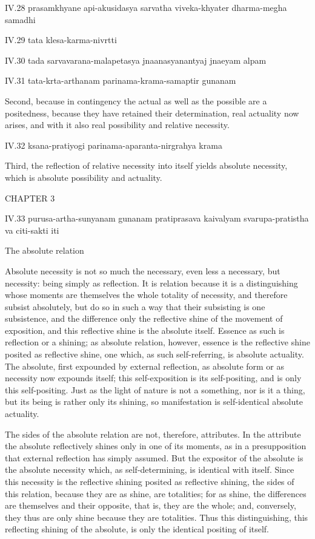 IV.28
prasamkhyane api-akusidasya sarvatha viveka-khyater dharma-megha samadhi

IV.29
tata klesa-karma-nivrtti

IV.30
tada sarvavarana-malapetasya jnaanasyanantyaj jnaeyam alpam

IV.31
tata-krta-arthanam parinama-krama-samaptir gunanam

Second, because in contingency the actual as well as the possible are a positedness,
because they have retained their determination, real actuality now arises,
and with it also real possibility and relative necessity.

IV.32
ksana-pratiyogi parinama-aparanta-nirgrahya krama

Third, the reflection of relative necessity into itself yields absolute necessity,
which is absolute possibility and actuality.

CHAPTER 3

IV.33
purusa-artha-sunyanam gunanam pratiprasava kaivalyam
svarupa-pratistha va citi-sakti iti

The absolute relation

Absolute necessity is not so much the necessary,
even less a necessary, but necessity:
being simply as reflection.
It is relation because it is a distinguishing
whose moments are themselves the whole totality of necessity,
and therefore subsist absolutely,
but do so in such a way that their subsisting is one subsistence,
and the difference only the reflective shine
of the movement of exposition,
and this reflective shine is the absolute itself.
Essence as such is reflection or a shining;
as absolute relation, however, essence is the
reflective shine posited as reflective shine,
one which, as such self-referring, is absolute actuality.
The absolute, first expounded by external reflection,
as absolute form or as necessity now expounds itself;
this self-exposition is its self-positing,
and is only this self-positing.
Just as the light of nature is not a something,
nor is it a thing, but its being is rather only its shining,
so manifestation is self-identical absolute actuality.

The sides of the absolute relation are not, therefore, attributes.
In the attribute the absolute reflectively shines only in one of its moments,
as in a presupposition that external reflection has simply assumed.
But the expositor of the absolute is the absolute necessity
which, as self-determining, is identical with itself.
Since this necessity is the reflective shining
posited as reflective shining, the sides of this relation,
because they are as shine, are totalities;
for as shine, the differences are themselves and their opposite,
that is, they are the whole;
and, conversely, they thus are only shine because they are totalities.
Thus this distinguishing, this reflecting shining of the absolute,
is only the identical positing of itself.

